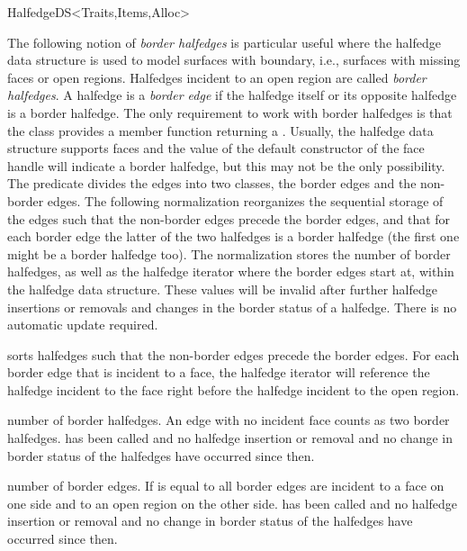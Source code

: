 \begin{ccRefConcept}{HalfedgeDS<Traits,Items,Alloc>}
\begin{ccAdvanced}
The following notion of {\em border halfedges\/} is particular useful
where the halfedge data structure is used to model surfaces with
boundary, i.e., surfaces with missing faces or open regions. Halfedges
incident to an open region are called {\em border halfedges}. A
halfedge is a {\em border edge\/} if the halfedge itself or its
opposite halfedge is a border halfedge. The only requirement to work
with border halfedges is that the
 class provides a member function 
returning a . Usually, the halfedge data structure
supports faces and the value of the default constructor of the face
handle will indicate a border halfedge, but this may not be the only
possibility. The  predicate divides the edges into
two classes, the border edges and the non-border edges. The
following normalization reorganizes the sequential storage of the
edges such that the non-border edges precede the border edges, and
that for each border edge the latter of the two halfedges is a
border halfedge (the first one might be a border halfedge too). The
normalization stores the number of border halfedges, as well as the
halfedge iterator where the border edges start at, within the
halfedge data structure.  These values will be invalid after further
halfedge insertions or removals and changes in the border status of 
a halfedge. There is no automatic update required.


    {sorts halfedges such that the non-border edges precede the
     border edges. For each border edge that is incident to a face,
     the halfedge iterator will reference the halfedge incident to the
     face right before the halfedge incident to the open region.}

    {number of border halfedges. An edge with no incident face
      counts as two border halfedges.
    \ccPrecond {} has been called and no
    halfedge insertion or removal and no change in border
    status of the halfedges have occurred since then.}

    {number of border edges. If  is equal
    to  all border edges are incident to
    a face on one side and to an open region on the other side.
    \ccPrecond {} has been called and no
    halfedge insertion or removal and no change in border
    status of the halfedges have occurred since then.}


\end{ccAdvanced}
\end{ccRefConcept}

